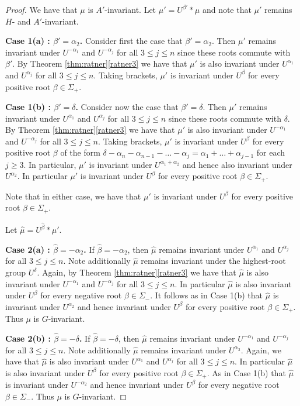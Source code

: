 \documentclass[10pt,reqno]{amsart}
\theoremstyle{Theorem}
\theoremstyle{definition}
\theoremstyle{remark}
\begin{document}
\begin{proof}
We have that $\mu$ is $A'$-invariant.  Let $\mu'= U^{\beta'}\ast \mu$ and note that $\mu'$ remains $H$- and $A'$-invariant.

 {\bf Case 1(a) : $\beta' = \alpha_2$.} Consider first the case that $\beta' = \alpha_2$.  Then $\mu'$ remains invariant under $U^{-\alpha_1}$ and $U^{-\alpha_j}$ for all $3\le j\le n$ since these roots commute with $\beta'$.
By Theorem \ref{thm:ratner}\ref{ratner3}   we have that $\mu'$ is also invariant under
$U^{\alpha_1}$ and $U^{\alpha_j}$ for all $3\le j\le n$.  Taking brackets, $\mu'$ is invariant under $U^\beta$ for every positive root $\beta\in \Sigma_+$.


 {\bf Case 1(b) : $ \beta' = \delta$.}
Consider now the case that $\beta' = \delta$.  Then $\mu'$ remains invariant under $U^{\alpha_1}$ and $U^{\alpha_j}$ for all $3\le j\le n$ since these roots commute with $\delta$.
By   Theorem \ref{thm:ratner}\ref{ratner3}  we have that $\mu'$ is also invariant under
$U^{-\alpha_1}$ and $U^{-\alpha_j}$ for all $3\le j\le n$.  Taking brackets, $\mu'$ is invariant under $U^\beta$ for every positive root $\beta$ of the form $\delta - \alpha_n - \alpha_{n-1} - \dots - \alpha_j = \alpha_1 +\dots + \alpha_{j-1}$ for each $j\ge 3$.  In particular, $\mu'$ is invariant under $U^{ \alpha_1 +\alpha_2}$ and hence also  invariant under $U^{ \alpha_2}$.  In particular $\mu'$ is invariant under $U^\beta$ for every positive root $\beta\in \Sigma_+$.

Note that in either case, we have that $\mu'$ is invariant under $U^\beta$ for every positive root $\beta\in \Sigma_+$.

Let $\hat \mu = U^{\hat \beta}\ast \mu'$.

 {\bf Case 2(a) : $\hat \beta = -\alpha_2$.}
If $\hat \beta = -\alpha_2$, then $\hat \mu$ remains invariant under $U^{\alpha_1}$ and $U^{\alpha_j}$ for all $3\le j\le n$.  Note additionally $\hat \mu$ remains invariant under the highest-root group $U^{\delta}$.  Again, by  Theorem \ref{thm:ratner}\ref{ratner3}  we have that $\hat \mu$ is also invariant under
$U^{-\alpha_1}$ and $U^{-\alpha_j}$ for all $3\le j\le n$.  In particular $\hat \mu$ is also invariant under  $U^\beta$ for every negative  root $\beta\in \Sigma_-$.   It follows as in Case 1(b) that $\hat \mu$ is invariant under $U^{\alpha_2}$ and hence invariant under $U^\beta$ for every positive  root $\beta\in \Sigma_+$.  Thus $\mu$ is $G$-invariant.

 {\bf Case 2(b) : $\hat \beta = -\delta$.}
If $\hat \beta = -\delta$, then $\hat \mu$ remains invariant under $U^{-\alpha_1}$ and $U^{-\alpha_j}$ for all $3\le j\le n$.  Note additionally $\hat \mu$ remains invariant under   $U^{\alpha_2}$.  Again,  we have that $\hat \mu$ is also invariant under
$U^{\alpha_1}$ and $U^{\alpha_j}$ for all $3\le j\le n$.  In particular $\hat \mu$ is also invariant under  $U^\beta$ for every positive  root $\beta\in \Sigma_+$.   As in Case 1(b) that $\hat \mu$ is invariant under $U^{-\alpha_2}$ and hence invariant under $U^\beta$ for every negative  root $\beta\in \Sigma_-$.  Thus $\mu$ is $G$-invariant.
\end{proof}
\end{document}
